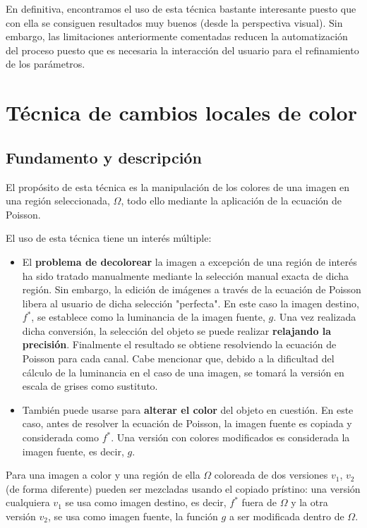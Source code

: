 \documentclass[11pt,twoside,titlepage,a4paper]{article}
\numberwithin{equation}{section} %
\theoremstyle{usual}
\begin{document}
En definitiva, encontramos el uso de esta técnica bastante interesante puesto que con ella se consiguen resultados muy buenos (desde la perspectiva visual). Sin embargo, las limitaciones anteriormente comentadas reducen la automatización del proceso puesto que es necesaria la interacción del usuario para el refinamiento de los parámetros.

\newpage

\section{Técnica de cambios locales de color}

\subsection{Fundamento y descripción}

El propósito de esta técnica es la manipulación de los colores de una imagen en una región seleccionada, $\Omega$, todo ello mediante la aplicación de la ecuación de Poisson.

El uso de esta técnica tiene un interés múltiple:

\begin{itemize}
    \item El \textbf{problema de decolorear} la imagen a excepción de una región de interés ha sido tratado manualmente mediante la selección manual exacta de dicha región. Sin embargo, la edición de imágenes a través de la ecuación de Poisson libera al usuario de dicha selección "perfecta". En este caso la imagen destino, $f^*$, se establece como la luminancia de la imagen fuente, $g$. Una vez realizada dicha conversión, la selección del objeto se puede realizar \textbf{relajando la precisión}. Finalmente el resultado se obtiene resolviendo la ecuación de Poisson para cada canal. Cabe mencionar que, debido a la dificultad del cálculo de la luminancia en el caso de una imagen, se tomará la versión en escala de grises como sustituto.
    \item También puede usarse para \textbf{alterar el color} del objeto en cuestión. En este caso, antes de resolver la ecuación de Poisson, la imagen fuente es copiada y considerada como $f^*$. Una versión con colores modificados es considerada la imagen fuente, es decir, $g$.
\end{itemize}

Para una imagen a color y una región de ella $\Omega$ coloreada de dos versiones $v_1$, $v_2$  (de forma diferente) pueden ser mezcladas usando el copiado prístino: una versión cualquiera $v_1$ se usa como imagen destino, es decir, $f^*$ fuera de $\Omega$ y la otra versión $v_2$, se usa como imagen fuente, la función $g$ a ser modificada dentro de $\Omega$. 
\end{document}
